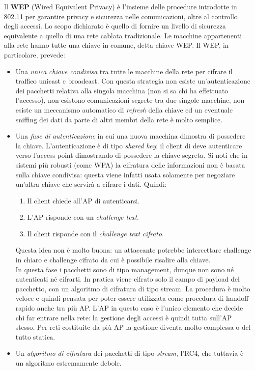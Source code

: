 Il \textbf{WEP} (Wired Equivalent Privacy) è l'insieme delle procedure introdotte in 802.11 per garantire privacy e sicurezza nelle comunicazioni, oltre al controllo degli accessi. Lo scopo dichiarato è quello di fornire un livello di sicurezza equivalente a quello di una rete cablata tradizionale. Le macchine appartenenti alla rete hanno tutte una chiave in comune, detta chiave WEP. Il WEP, in particolare, prevede:
\begin{itemize}
	\item Una \textit{unica chiave condivisa} tra tutte le macchine della rete per cifrare il traffico unicast e broadcast. Con questa strategia non esiste un'autenticazione dei pacchetti relativa alla singola macchina (non si sa chi ha effettuato l'accesso), non esistono comunicazioni segrete tra due singole macchine, non esiste un meccanismo automatico di \textit{refresh} della chiave ed un eventuale sniffing dei dati da parte di altri membri della rete è molto semplice.
	\item Una \textit{fase di autenticazione} in cui una nuova macchina dimostra di possedere la chiave. L'autenticazione è di tipo \textit{shared key}: il client di deve autenticare verso l'access point dimostrando di possedere la chiave segreta. Si noti che in sistemi più robusti (come WPA) la cifratura delle informazioni non è basata sulla chiave condivisa: questa viene infatti usata solamente per negoziare un'altra chiave che servirà a cifrare i dati. Quindi:
	\begin{enumerate}
		\item Il client chiede all'AP di autenticarsi.
		\item L'AP risponde con un \textit{challenge text}.
		\item Il client risponde con il \textit{challenge text cifrato}.
	\end{enumerate}
	Questa idea non è molto buona: un attaccante potrebbe intercettare challenge in chiaro e challenge cifrato da cui è possibile risalire alla chiave.\\
	In questa fase i pacchetti sono di tipo management, dunque non sono né autenticati né cifrarti. In pratica viene cifrato solo il campo di payload del pacchetto, con un algoritmo di cifratura di tipo stream. La procedura è molto veloce e quindi pensata per poter essere utilizzata come procedura di handoff rapido anche tra più AP. L'AP in questo caso è l'unico elemento che decide chi far entrare nella rete: la gestione degli accessi è quindi tutta sull'AP stesso. Per reti costituite da più AP la gestione diventa molto complessa o del tutto statica.
	\item Un \textit{algoritmo di cifratura} dei pacchetti di tipo \textit{stream}, l'RC4, che tuttavia è un algoritmo estremamente debole.
\end{itemize}
